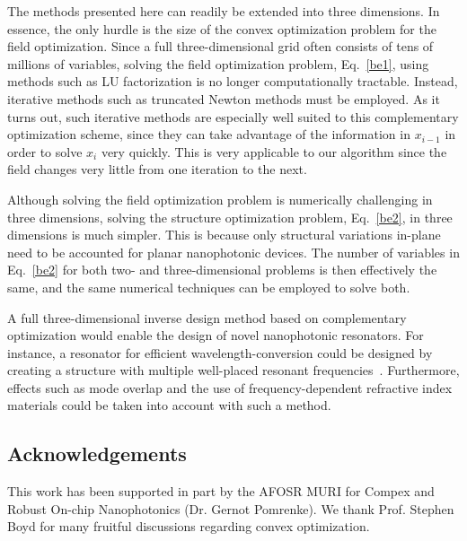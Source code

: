 \documentclass[10pt,letterpaper]{article}
\begin{document}
The methods presented here can readily be extended into three dimensions. In essence, the only hurdle is the size of the convex optimization problem for the field optimization. Since a full three-dimensional grid often consists of tens of millions of variables, solving the field optimization problem, Eq.~\eqref{be1}, using methods such as LU factorization is no longer computationally tractable. Instead, iterative methods such as truncated Newton methods must be employed. As it turns out, such iterative methods are especially well suited to this complementary optimization scheme, since they can take advantage of the information in $x_{i-1}$ in order to solve $x_i$ very quickly. This is very applicable to our algorithm since the field changes very little from one iteration to the next. 

Although solving the field optimization problem is numerically challenging in three dimensions, solving the structure optimization problem, Eq.~\eqref{be2}, in three dimensions is much simpler. This is because only structural variations in-plane need to be accounted for planar nanophotonic devices. The number of variables in Eq.~\eqref{be2} for both two- and three-dimensional problems is then effectively the same, and the same numerical techniques can be employed to solve both.

A full three-dimensional inverse design method based on complementary optimization would enable the design of novel nanophotonic resonators. For instance, a resonator for efficient wavelength-conversion could be designed by creating a structure with multiple well-placed resonant frequencies~\cite{Riv09}. Furthermore, effects such as mode overlap and the use of frequency-dependent refractive index materials could be taken into account with such a method. 


\subsection*{Acknowledgements}
This work has been supported in part by the AFOSR MURI for Compex and Robust On-chip Nanophotonics (Dr. Gernot Pomrenke).
We thank Prof. Stephen Boyd for many fruitful discussions regarding convex optimization.
\end{document}
